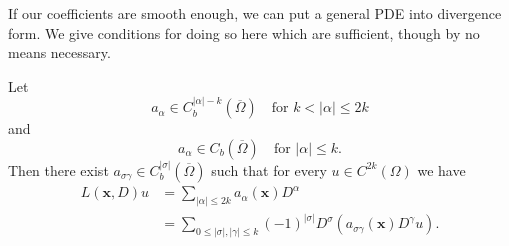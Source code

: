 If our coefficients are smooth enough, we can put a general PDE into divergence form. We give conditions for doing so here which are sufficient, though by no means necessary.

\begin{Lemma}
\label{lem:smooth-coefficients-divergence-conversion}
Let
\begin{equation}\label{eq:divergence-conversion-higher-coefficient-smoothness}
a_\alpha\in C_b^{|\alpha|-k}(\overline\Omega)\quad\text{for }k<|\alpha|\leq2k
\end{equation}
and
\begin{equation}\label{eq:divergence-conversion-lower-coefficient-continuity}
a_\alpha\in C_b(\overline\Omega)\quad\text{for }|\alpha|\leq k.
\end{equation}
Then there exist $a_{\sigma\gamma}\in C_b^{|\sigma|}(\overline\Omega)$ such that for every $u\in C^{2k}(\Omega)$ we have\[\begin{aligned}
L(\bm{x},D)u&=\sum_{|\alpha|\leq2k}a_\alpha(\bm{x})D^\alpha\\
&=\sum_{0\leq|\sigma|,|\gamma|\leq k}(-1)^{|\sigma|}D^\sigma(a_{\sigma\gamma}(\bm{x})D^\gamma u).
\end{aligned}\]
\end{Lemma}

